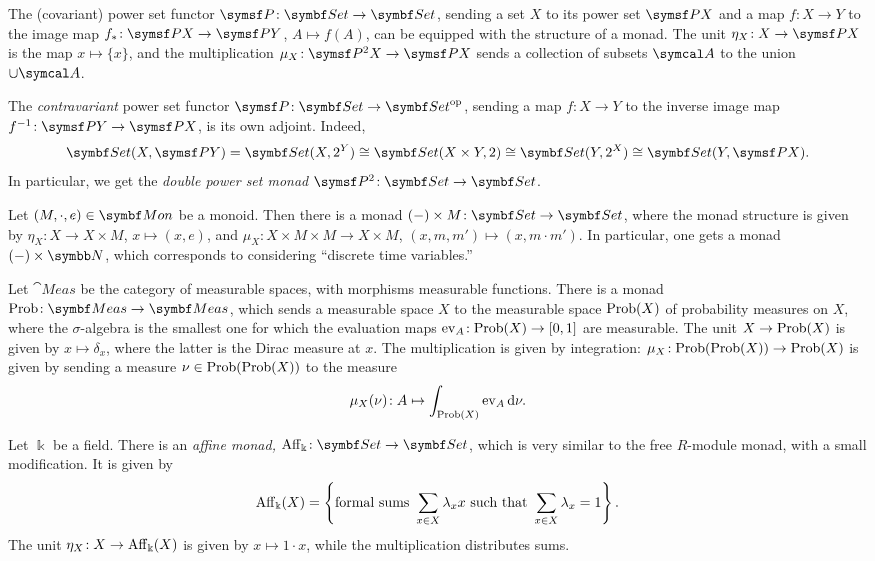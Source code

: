 \begin{example}
	The (covariant) power set functor \(\sfP\!:\Set\to\Set\), sending a set \(X\) to its power set \(\sfP X\) and a map \(f\!:X\to Y\) to the image map \(f_*\!:\sfP X\to\sfP Y\), \(A\mapsto f(A)\),
	can be equipped with the structure of a monad. The unit \(\eta_X\!:X\to\sfP X\) is the map \(x\mapsto \{x\}\), and the multiplication \(\mu_X\!:\sfP^2X\to\sfP X\) sends a collection of subsets \(\calA\)
	to the union \(\cup\calA\).
\end{example}
\begin{example}
	The \emph{contravariant} power set functor \(\sfP\!:\Set\to\Set^\op\), sending a map \(f\!:X\to Y\) to the inverse image map \(f^{-1}\!:\sfP Y\to \sfP X\), is its own adjoint. Indeed,
	\[ \Set(X,\sfP Y) = \Set(X,2^Y) \cong \Set(X\times Y,2)\cong\Set(Y,2^X)\cong\Set(Y,\sfP X). \]
	In particular, we get the \emph{double power set monad} \(\sfP^2\!:\Set\to\Set\).
\end{example}
\begin{example}
	Let \((M,\cdot,e)\in\Mon\) be a monoid. Then there is a monad \((-)\times M\!:\Set\to\Set\), where the monad structure is given by \(\eta_X\!:X\to X\times M\), \(x\mapsto (x,e)\),
	and \(\mu_X\!:X\times M\times M\to X\times M\), \((x,m,m')\mapsto (x,m\cdot m')\). In particular, one gets a monad \((-)\times\N\), which corresponds to considering ``discrete time variables.''
\end{example}
\begin{example}
	Let \(\cat{Meas}\) be the category of measurable spaces, with morphisms measurable functions. There is a monad \(\Prob\!:\cat{Meas}\to\cat{Meas}\), which sends a measurable space
	\(X\) to the measurable space \(\operatorname{Prob}(X)\) of probability measures on \(X\), where the \(\sigma\)-algebra is the smallest one for which the evaluation maps \(\operatorname{ev}_A\!:\operatorname{Prob}(X)\to[0,1]\) are measurable.
	The unit \(X\to\operatorname{Prob}(X)\) is given by \(x\mapsto\delta_x\), where the latter is the Dirac measure at \(x\). The multiplication is given by integration: \(\mu_X\!:\operatorname{Prob}(\operatorname{Prob}(X))\to\operatorname{Prob}(X)\)
	is given by sending a measure \(\nu\in\operatorname{Prob}(\operatorname{Prob}(X))\) to the measure
	\[ \mu_X(\nu)\!: A \mapsto \int_{\operatorname{Prob}(X)} \operatorname{ev}_A\mathop{}\!\mathrm{d}\nu. \]
\end{example}
\begin{example}
	Let \(\Bbbk\) be a field. There is an \emph{affine monad,} \(\Aff_\Bbbk\!:\Set\to\Set\), which is very similar to the free \(R\)-module monad, with a small modification.
	It is given by
	\[ \operatorname{Aff}_\Bbbk(X) = \left\{\text{formal sums } \sum_{x\in X}\lambda_x x\text{ such that } \sum_{x\in X}\lambda_x = 1\right\}. \]
	The unit \(\eta_X\!:X\to\operatorname{Aff}_\Bbbk(X)\) is given by \(x\mapsto 1\cdot x\), while the multiplication distributes sums.
\end{example}

